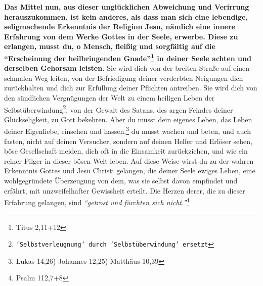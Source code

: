 \textbf{Das Mittel nun, aus dieser unglücklichen Abweichung und Verirrung
herauszukommen,
ist kein anderes, als dass man sich eine lebendige, seligmachende Erkenntnis der
Religion Jesu, nämlich eine innere Erfahrung von dem
Werke Gottes in der Seele,
erwerbe. Diese zu erlangen, musst du, o Mensch, fleißig und sorgfältig auf die
"`Erscheinung der heilbringenden Gnade"'\footnote{Titus 2,11+12}
in deiner Seele
achten und derselben Gehorsam leisten.} Sie wird dich von der breiten Straße auf
einen schmalen Weg leiten, von der Befriedigung deiner verderbten Neigungen dich
zurückhalten und dich zur Erfüllung deiner Pflichten antreiben.
Sie wird dich
von den sündlichen Vergnügungen der Welt zu einem
heiligen Leben der
Selbstüberwindung\footnote{\texttt{'Selbstverleugnung' durch 'Selbstüberwindung'
ersetzt}}, von der Gewalt des Satans, des argen Feindes
deiner
Glückseligkeit, zu Gott bekehren. Aber du musst dein
eigenes Leben, das Leben
deiner Eigenliebe, einsehen und hassen,\footnote{Lukas
14,26) Johannes 12,25) Matthäus 10,39}
du musst wachen und beten, und auch fasten, nicht auf
deinen Versucher,
sondern auf deinen Helfer und Erlöser sehen, böse
Gesellschaft meiden, dich oft
in die Einsamkeit zurückziehen, und wie ein reiner
Pilger in dieser bösen Welt
leben. Auf diese Weise wirst du zu der wahren Erkenntnis
Gottes und Jesu Christi
gelangen, die deiner Seele ewiges Leben, eine wohlgegründete
Überzeugung von
dem, was sie selbst davon empfindet und erfährt, mit unzweifelhafter Gewissheit
erteilt. Die Herzen derer, die zu dieser Erfahrung gelangen, sind
\textit{"`getrost und fürchten sich nicht."'}\footnote{Psalm 112,7+8}



